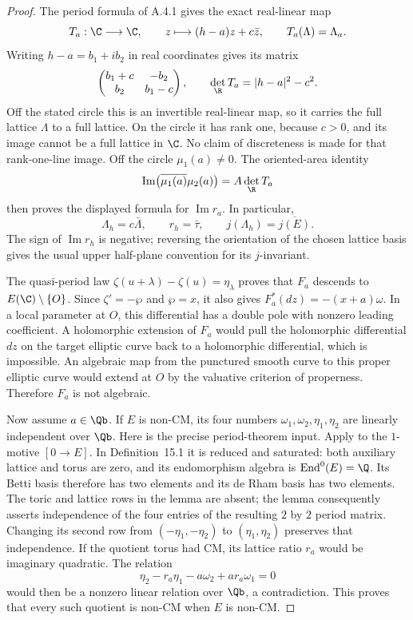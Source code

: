 \begin{proof}
The period formula of A.4.1 gives the exact real-linear map
\[
 T_a:\C\longrightarrow\C,\qquad
 z\longmapsto(h-a)z+c\bar z,
 \qquad T_a(\Lambda)=\Lambda_a.
\]
Writing $h-a=b_1+ib_2$ in real coordinates gives its matrix
\[
 \begin{pmatrix}b_1+c&-b_2\\ b_2&b_1-c\end{pmatrix},
 \qquad \det_{\R}T_a=|h-a|^2-c^2.
\]
Off the stated circle this is an invertible real-linear map, so it
carries the full lattice $\Lambda$ to a full lattice. On the circle it
has rank one, because $c>0$, and its image cannot be a full lattice in
$\C$. No claim of discreteness is made for that rank-one-line image.
Off the circle $\mu_1(a)\ne0$. The oriented-area identity
\[
 \operatorname{Im}\bigl(\overline{\mu_1(a)}\mu_2(a)\bigr)
       =A\det_{\R}T_a
\]
then proves the displayed formula for $\operatorname{Im}r_a$.
In particular,
\[
 \Lambda_h=c\bar\Lambda,\qquad r_h=\bar\tau,\qquad
 j(\Lambda_h)=\overline{j(E)}.
\]
The sign of $\operatorname{Im}r_h$ is negative; reversing the
orientation of the chosen lattice basis gives the usual upper
half-plane convention for its $j$-invariant.

The quasi-period law
$\zeta(u+\lambda)-\zeta(u)=\eta_\lambda$ proves that $F_a$ descends to
$E(\C)\setminus\{O\}$. Since $\zeta'=-\wp$ and $\wp=x$, it also gives
$F_a^*(dz)=-(x+a)\omega$. In a local parameter at $O$, this differential
has a double pole with nonzero leading coefficient. A holomorphic
extension of $F_a$ would pull the holomorphic differential $dz$ on the
target elliptic curve back to a holomorphic differential, which is
impossible. An algebraic map from the punctured smooth curve to this
proper elliptic curve would extend at $O$ by the valuative criterion
of properness. Therefore $F_a$ is not algebraic.

Now assume $a\in\Qb$. If $E$ is non-CM, its four numbers
$\omega_1,\omega_2,\eta_1,\eta_2$ are linearly independent over $\Qb$.
Here is the precise period-theorem input. Apply
\cite[Lemma 15.6, pp.136--138 of the opened manuscript]{EllHuberWustholz2022}
to the $1$-motive $[0\to E]$. In Definition~15.1 it is reduced and
saturated: both auxiliary lattice and torus are zero, and its
endomorphism algebra is $\operatorname{End}^0(E)=\Q$.
Its Betti basis therefore has two elements and its de Rham basis has
two elements. The toric and lattice rows in the lemma are absent;
the lemma consequently asserts independence of the four entries of
the resulting $2$ by $2$ period matrix. Changing its second row from
$(-\eta_1,-\eta_2)$ to $(\eta_1,\eta_2)$ preserves that independence.
If the quotient torus had CM, its lattice ratio $r_a$ would be
imaginary quadratic. The relation
\[
 \eta_2-r_a\eta_1-a\omega_2+a r_a\omega_1=0
\]
would then be a nonzero linear relation over $\Qb$, a contradiction.
This proves that every such quotient is non-CM when $E$ is non-CM.


\end{proof}

